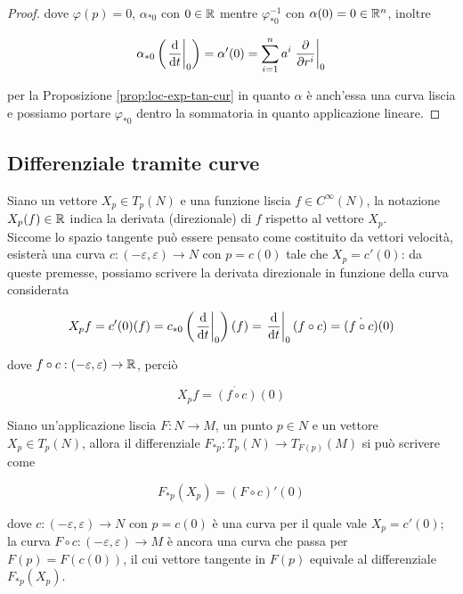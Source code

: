 \begin{proof}
	dove $ \varphi(p) = 0 $, $ \alpha_{*0} $ con $ 0 \in \mathbb{R} $ mentre $ \varphi^{-1}_{*0} $ con $ \alpha(0) = 0 \in \mathbb{R}^{n} $, inoltre
	
	\begin{equation}
		\alpha_{*0} \left( \eval{ \dv{t} }_{0} \right) = \alpha'(0) %
		= \sum_{i=1}^{n} a^{i} \eval{ \pdv{r^{i}} }_{0}
	\end{equation}

	per la Proposizione \ref{prop:loc-exp-tan-cur} in quanto $ \alpha $ è anch'essa una curva liscia e possiamo portare $ \varphi_{*0} $ dentro la sommatoria in quanto applicazione lineare.
\end{proof}

\subsection{Differenziale tramite curve}

Siano un vettore $ X_{p} \in T_{p}(N) $ e una funzione liscia $ f \in C^{\infty}(N) $, la notazione $ X_{p}(f) \in \mathbb{R} $ indica la derivata (direzionale) di $ f $ rispetto al vettore $ X_{p} $. \\
Siccome lo spazio tangente può essere pensato come costituito da vettori velocità, esisterà una curva $ c : (-\varepsilon,\varepsilon) \to N $ con $ p = c(0) $ tale che $ X_{p} = c'(0) $: da queste premesse, possiamo scrivere la derivata direzionale in funzione della curva considerata

\begin{equation}
	X_{p} f = c'(0) (f) %
	= c_{*0} \left( \eval{ \dv{t} }_{0} \right) (f) %
	= \eval{ \dv{t} }_{0} (f \circ c) %
	= \dot{(f \circ c)}(0)
\end{equation}

dove $ f \circ c : (-\varepsilon,\varepsilon) \to \mathbb{R} $, perciò

\begin{equation}
	X_{p} f = \dot{(f \circ c)}(0)
\end{equation}

\begin{definition}
	Siano un'applicazione liscia $ F : N \to M $, un punto $ p \in N $ e un vettore $ X_{p} \in T_{p}(N) $, allora il differenziale $ F_{*p} : T_{p}(N) \to T_{F(p)}(M) $ si può scrivere come
	
	\begin{equation}
		F_{*p}(X_{p}) = (F \circ c)' (0)
	\end{equation}

	dove $ c : (-\varepsilon,\varepsilon) \to N $ con $ p = c(0) $ è una curva per il quale vale $ X_{p} = c'(0) $; la curva $ F \circ c : (-\varepsilon,\varepsilon) \to M $ è ancora una curva che passa per $ F(p) = F(c(0)) $, il cui vettore tangente in $ F(p) $ equivale al differenziale $ F_{*p}(X_{p}) $.
	
\end{definition}

